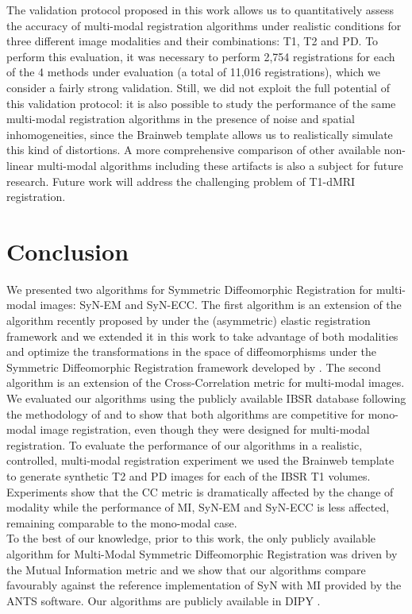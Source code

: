 The validation protocol proposed in this work allows us to quantitatively assess the accuracy of multi-modal registration algorithms under realistic conditions for three different image modalities and their combinations: T1, T2 and PD. To perform this evaluation, it was necessary to perform 2,754 registrations for each of the 4 methods under evaluation (a total of 11,016 registrations), which we consider a fairly strong validation. Still, we did not exploit the full potential of this validation protocol: it is also possible to study the performance of the same multi-modal registration algorithms in the presence of noise and spatial inhomogeneities, since the Brainweb template allows us to realistically simulate this kind of distortions. A more comprehensive comparison of other available non-linear multi-modal algorithms including these artifacts is also a subject for future research. Future work will address the challenging problem of T1-dMRI registration.


\section{Conclusion}
We presented two algorithms for Symmetric Diffeomorphic Registration for multi-modal images: SyN-EM and SyN-ECC. The first algorithm is an extension of the algorithm recently proposed by \cite{Arce-santana2014} under the (asymmetric) elastic registration framework and we extended it in this work to take advantage of both modalities and optimize the transformations in the space of diffeomorphisms under the Symmetric Diffeomorphic Registration framework developed by \cite{Avants2008, Avants2011}. The second algorithm is an extension of the Cross-Correlation metric for multi-modal images. We evaluated our algorithms using the publicly available IBSR database following the methodology of \cite{Klein2009, Klein2010} and \cite{Rohlfing2012} to show that both algorithms are competitive for mono-modal image registration, even though they were designed for multi-modal registration. To evaluate the performance of our algorithms in a realistic, controlled, multi-modal registration experiment we used the Brainweb \citep{Cocosco1997, Kwan1999} template to generate synthetic T2 and PD images for each of the IBSR T1 volumes. Experiments show that the CC metric is dramatically affected by the change of modality while the performance of MI, SyN-EM and SyN-ECC is less affected, remaining comparable to the mono-modal case.\\

To the best of our knowledge, prior to this work, the only publicly available algorithm for Multi-Modal Symmetric Diffeomorphic Registration was driven by the Mutual Information metric and we show that our algorithms compare favourably against the reference implementation of SyN with MI provided by the ANTS software. Our algorithms are publicly available in DIPY \citep{Garyfallidis2014}.
